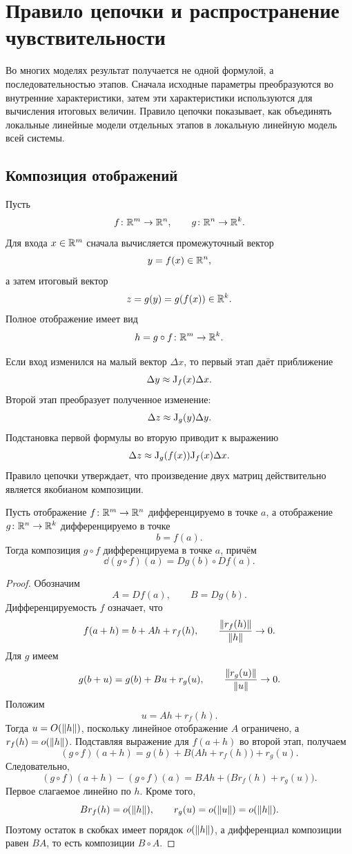 \section{Правило цепочки и распространение чувствительности}
\label{sec:chain-rule-sensitivity}

Во многих моделях результат получается не одной формулой, а последовательностью этапов. Сначала исходные параметры преобразуются во внутренние характеристики, затем эти характеристики используются для вычисления итоговых величин. Правило цепочки показывает, как объединять локальные линейные модели отдельных этапов в локальную линейную модель всей системы.

\subsection{Композиция отображений}

Пусть
\[
f\colon \mathbb{R}^m\to\mathbb{R}^n,
\qquad
g\colon \mathbb{R}^n\to\mathbb{R}^k.
\]
Для входа \(x\in\mathbb{R}^m\) сначала вычисляется промежуточный вектор
\[
y=f(x)\in\mathbb{R}^n,
\]
а затем итоговый вектор
\[
z=g(y)=g(f(x))\in\mathbb{R}^k.
\]
Полное отображение имеет вид
\[
h=g\circ f\colon\mathbb{R}^m\to\mathbb{R}^k.
\]

Если вход изменился на малый вектор \(\Delta x\), то первый этап даёт приближение
\[
\Delta y
\approx
\mathrm{J}_{f}(x)\Delta x.
\]
Второй этап преобразует полученное изменение:
\[
\Delta z
\approx
\mathrm{J}_{g}(y)\Delta y.
\]
Подстановка первой формулы во вторую приводит к выражению
\[
\Delta z
\approx
\mathrm{J}_{g}(f(x))\mathrm{J}_{f}(x)\Delta x.
\]
Правило цепочки утверждает, что произведение двух матриц действительно является якобианом композиции.

\begin{theorem}
Пусть отображение \(f\colon\mathbb{R}^m\to\mathbb{R}^n\) дифференцируемо в точке \(a\), а отображение \(g\colon\mathbb{R}^n\to\mathbb{R}^k\) дифференцируемо в точке
\[
b=f(a).
\]
Тогда композиция \(g\circ f\) дифференцируема в точке \(a\), причём
\begin{equation}
\dd(g\circ f)(a)
=
Dg(b)\circ Df(a).
\label{eq:chain-rule-differential}
\end{equation}
\end{theorem}

\begin{proof}
Обозначим
\[
A=Df(a),
\qquad
B=Dg(b).
\]
Дифференцируемость \(f\) означает, что
\[
f(a+h)=b+Ah+r_f(h),
\qquad
\frac{\lVert r_f(h)\rVert}{\lVert h\rVert}\to0.
\]
Для \(g\) имеем
\[
g(b+u)=g(b)+Bu+r_g(u),
\qquad
\frac{\lVert r_g(u)\rVert}{\lVert u\rVert}\to0.
\]
Положим
\[
u=Ah+r_f(h).
\]
Тогда \(u=O(\lVert h\rVert)\), поскольку линейное отображение \(A\) ограничено, а \(r_f(h)=o(\lVert h\rVert)\). Подставляя выражение для \(f(a+h)\) во второй этап, получаем
\[
(g\circ f)(a+h)
=
g(b)+B\bigl(Ah+r_f(h)\bigr)+r_g(u).
\]
Следовательно,
\[
(g\circ f)(a+h)-(g\circ f)(a)
=
BAh+\bigl(Br_f(h)+r_g(u)\bigr).
\]
Первое слагаемое линейно по \(h\). Кроме того,
\[
Br_f(h)=o(\lVert h\rVert),
\qquad
r_g(u)=o(\lVert u\rVert)=o(\lVert h\rVert).
\]
Поэтому остаток в скобках имеет порядок \(o(\lVert h\rVert)\), а дифференциал композиции равен \(BA\), то есть композиции \(B\circ A\).
\end{proof}

